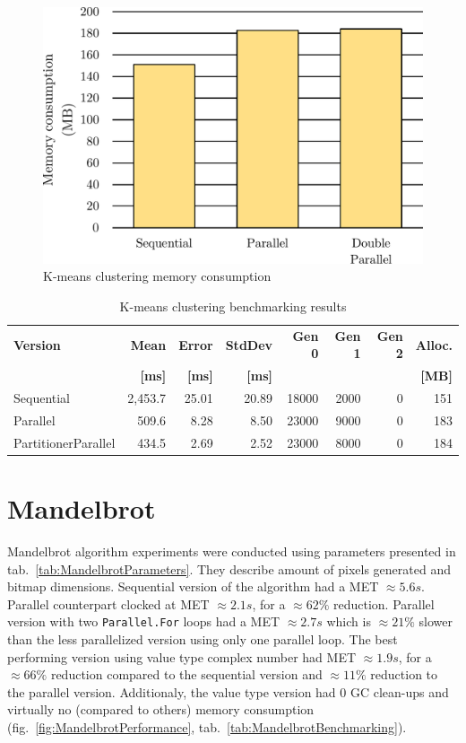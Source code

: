 \begin{figure}[htb]
\centering
\includegraphics[width=.62\linewidth]{figures04/KMeansMemory.pdf}
\caption{K-means clustering memory consumption}
\label{fig:KMeansMemory}
\end{figure}

\begin{table}[ht]\small
    \centering
    \caption{K-means clustering benchmarking results}
		\label{tab:KMeansBenchmarking}
    \begin{tabularx}{\linewidth}{Xrrrrrrr} 
		\toprule
		\toprule
			\bfseries Version 		&
			\bfseries Mean 	      &
			\bfseries Error       &
			\bfseries StdDev 	    &
			\bfseries Gen 0	    	&
			\bfseries Gen 1	    	&
			\bfseries Gen 2	    	&
			\bfseries Alloc.      \\ 
			&
			\bfseries {[}ms{]} &
			\bfseries {[}ms{]} &
			\bfseries {[}ms{]} &
			&
			&
			&
			\bfseries{[}MB{]} \\	
			\midrule 
Sequential & 2,453.7 	& 25.01	& 20.89	& 18000 & 	2000 & 	0 & 151  \\
Parallel & 509.6 	& 8.28 	& 8.50 	& 23000 & 	9000 & 	0 & 183  \\ 
PartitionerParallel & 434.5 	& 2.69 	& 2.52 	& 23000 & 	8000 & 	0 & 184  \\
			\bottomrule
		\end{tabularx}
\end{table}

\section{Mandelbrot}
\label{sec: Mandelbrot}
Mandelbrot algorithm experiments were conducted using parameters presented in 
tab.~\ref{tab:MandelbrotParameters}. They describe amount of pixels 
generated and bitmap dimensions.
Sequential version of the algorithm had a MET $\approx 5.6s$. Parallel 
counterpart clocked at MET $\approx 2.1s$, for a $\approx 62\%$ reduction. 
Parallel version with two \texttt{Parallel.For} loops had a MET $\approx 2.7s$ 
which is $\approx 21\%$ slower than the less parallelized version using only 
one parallel loop. The best performing version using value type complex 
number had MET $\approx 1.9s$, for a $\approx 66\%$  reduction compared to 
the sequential version and $\approx 11\%$  reduction to the parallel version. 
Additionaly, the value type version had 0 GC clean-ups and virtually no (compared to others) memory consumption (fig.~\ref{fig:MandelbrotPerformance}, tab.~\ref{tab:MandelbrotBenchmarking}).

